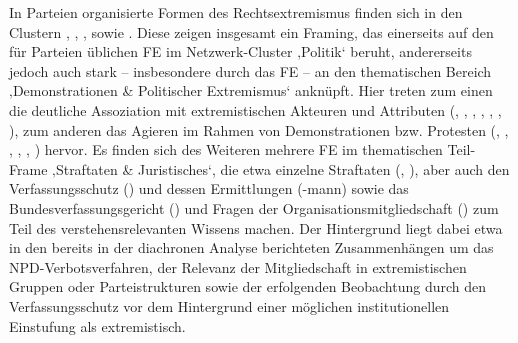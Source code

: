 In Parteien organisierte Formen des Rechtsextremismus finden sich in den Clustern , , ,  sowie . Diese zeigen insgesamt ein Framing, das einerseits auf den für Parteien üblichen FE im Netzwerk-Cluster ‚Politik` beruht, andererseits jedoch auch stark -- insbesondere durch das FE  -- an den thematischen Bereich ‚Demonstrationen \& Politischer Extremismus` anknüpft. Hier treten zum einen die deutliche Assoziation mit extremistischen Akteuren und Attributen (, , , , , , ), zum anderen das Agieren im Rahmen von Demonstrationen bzw. Protesten (, , , , , ) hervor. Es finden sich des Weiteren mehrere FE im thematischen Teil-Frame ‚Straftaten \& Juristisches`, die etwa einzelne Straftaten (, ), aber auch den Verfassungsschutz () und dessen Ermittlungen (-mann) sowie das Bundesverfassungsgericht () und Fragen der Organisationsmitgliedschaft () zum Teil des verstehensrelevanten Wissens machen. Der Hintergrund liegt dabei etwa in den bereits in der diachronen Analyse berichteten Zusammenhängen um das NPD-Verbotsverfahren, der Relevanz der Mitgliedschaft in extremistischen Gruppen oder Parteistrukturen sowie der erfolgenden Beobachtung durch den Verfassungsschutz vor dem Hintergrund einer möglichen institutionellen Einstufung als extremistisch.
\largerpage

